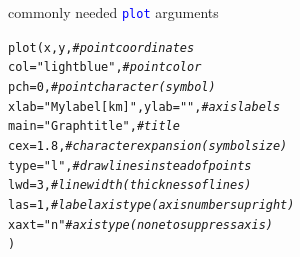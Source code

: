 \documentclass[xcolor=table,           xcolor=dvipsnames]{beamer}\usepackage[]{graphicx}\usepackage[]{color}
\makeatletter
\newcommand{\hlnum}[1]{\textcolor[rgb]{0,0,0}{#1}}
\newcommand{\hlstr}[1]{\textcolor[rgb]{0.545,0.137,0.137}{#1}}
\newcommand{\hlcom}[1]{\textcolor[rgb]{0,0.392,0}{\textit{#1}}}
\newcommand{\hlopt}[1]{\textcolor[rgb]{0,0,0}{#1}}
\newcommand{\hlstd}[1]{\textcolor[rgb]{0,0,0}{#1}}
\newcommand{\hlkwc}[1]{\textcolor[rgb]{1,0,1}{#1}}
\newcommand{\hlkwd}[1]{\textcolor[rgb]{0,0,1}{#1}}
\newenvironment{kframe}{%
 \def\at@end@of@kframe{}%
 \ifinner\ifhmode%
  \def\at@end@of@kframe{\end{minipage}}%
  \begin{minipage}{\columnwidth}%
 \fi\fi%
 \def\FrameCommand##1{\hskip\@totalleftmargin \hskip-\fboxsep
 \colorbox{shadecolor}{##1}\hskip-\fboxsep
     \hskip-\linewidth \hskip-\@totalleftmargin \hskip\columnwidth}%
 \MakeFramed {\advance\hsize-\width
   \@totalleftmargin\z@ \linewidth\hsize
   \@setminipage}}%
 {\par\unskip\endMakeFramed%
 \at@end@of@kframe}
\newenvironment{knitrout}{}{} %
\newcounter{exercisecount}
\newcommand{\rcode}[1]{\texttt{\textcolor{Blue}{#1}}} %
\makeatother
\begin{document}



\begin{frame}[fragile]{commonly needed \rcode{plot} arguments}
\begin{knitrout}
\color{fgcolor}\begin{kframe}
\begin{alltt}
\hlkwd{plot}\hlstd{(x, y,} \hlcom{# point coordinates}
\hlkwc{col}\hlstd{=}\hlstr{"lightblue"}\hlstd{,} \hlcom{# point color}
\hlkwc{pch}\hlstd{=}\hlnum{0}\hlstd{,} \hlcom{# point character (symbol)}
\hlkwc{xlab}\hlstd{=}\hlstr{"My label  [km]"}\hlstd{,} \hlkwc{ylab}\hlstd{=}\hlstr{""}\hlstd{,} \hlcom{# axis labels}
\hlkwc{main}\hlstd{=}\hlstr{"Graph title"}\hlstd{,} \hlcom{# title}
\hlkwc{cex}\hlstd{=}\hlnum{1.8}\hlstd{,} \hlcom{# character expansion (symbol size)}
\hlkwc{type}\hlstd{=}\hlstr{"l"}\hlstd{,} \hlcom{# draw lines instead of points}
\hlkwc{lwd}\hlstd{=}\hlnum{3}\hlstd{,} \hlcom{# line width (thickness of lines)}
\hlkwc{las}\hlstd{=}\hlnum{1}\hlstd{,} \hlcom{# label axis type (axis numbers upright)}
\hlkwc{xaxt}\hlstd{=}\hlstr{"n"} \hlcom{# axis type (none to suppress axis)}
\hlstd{)}
\end{alltt}
\end{kframe}
\end{knitrout}
\end{frame}
\end{document}
